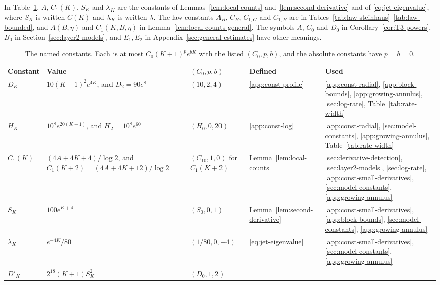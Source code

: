 In Table~\ref{tab:named-constants}, $A$, $C_1(K)$, $S_K$ and $\lambda_K$
are the constants of Lemmas~\ref{lem:local-counts}
and~\ref{lem:second-derivative} and of \eqref{eq:jet-eigenvalue}, where
$S_K$ is written $C(K)$ and $\lambda_K$ is written $\lambda$.
The law constants $A_B$, $C_B$, $C_{1,G}$ and $C_{1,B}$ are in
Tables~\ref{tab:law-steinhaus}--\ref{tab:law-bounded}, and $A(B,\eta)$
and $C_1(K,B,\eta)$ in Lemma~\ref{lem:local-counts-general}.
The symbols $A$, $C_0$ and $D_0$ in Corollary~\ref{cor:T3-powers}, $B_0$
in Section~\ref{sec:layer2-models}, and $E_1,E_2$ in
Appendix~\ref{sec:general-estimates} have other meanings.
\begin{table}[p]
\centering
\footnotesize
\setlength{\tabcolsep}{3pt}
\caption{The named constants. Each is at most $C_0(K+1)^pe^{bK}$ with the
listed $(C_0,p,b)$, and the absolute constants have $p=b=0$.}
\label{tab:named-constants}
\begin{tabular}{@{}>{\raggedright\arraybackslash}p{}
>{\raggedright\arraybackslash}p{}
>{\raggedright\arraybackslash}p{}
>{\raggedright\arraybackslash}p{}
>{\raggedright\arraybackslash}p{}@{}}
\toprule
Constant & Value & $(C_0,p,b)$ & Defined & Used\\
\midrule
$D_K$ & $10(K+1)^2e^{4K}$, and $D_2=90e^8$ & $(10,2,4)$
 & \ref{app:const-profile}
 & \ref{app:const-radial}, \ref{app:block-bounds},
 \ref{app:growing-annulus}, \ref{sec:log-rate},
 Table~\ref{tab:rate-width}\\
$H_K$ & $10^8e^{20(K+1)}$, and $H_2=10^8e^{60}$ & $(H_0,0,20)$
 & \ref{app:const-log}
 & \ref{app:const-radial}, \ref{sec:model-constants},
 \ref{app:growing-annulus}, Table~\ref{tab:rate-width}\\
$C_1(K)$ & $(4A+4K+4)/\log2$, and $C_1(K+2)=(4A+4K+12)/\log2$
 & $(C_{10},1,0)$ for $C_1(K+2)$
 & Lemma~\ref{lem:local-counts}
 & \ref{sec:derivative-detection}, \ref{sec:layer2-models},
 \ref{sec:log-rate}, \ref{app:const-small-derivatives},
 \ref{sec:model-constants}, \ref{app:growing-annulus}\\
$S_K$ & $100e^{K+4}$ & $(S_0,0,1)$
 & Lemma~\ref{lem:second-derivative}
 & \ref{app:const-small-derivatives}, \ref{app:block-bounds},
 \ref{sec:model-constants}, \ref{app:growing-annulus}\\
$\lambda_K$ & $e^{-4K}/80$ & $(1/80,0,-4)$
 & \eqref{eq:jet-eigenvalue}
 & \ref{app:const-small-derivatives}, \ref{sec:model-constants},
 \ref{app:growing-annulus}\\
$D'_K$ & $2^{18}(K+1)S_K^2$ & $(D_0,1,2)$

\end{tabular}
\end{table}
